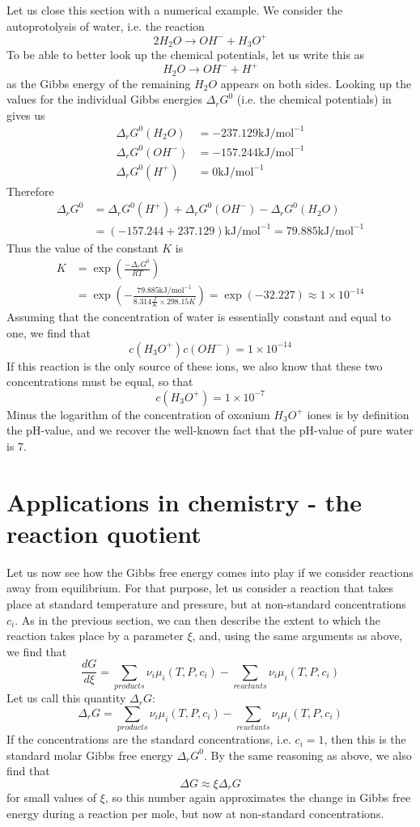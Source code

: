 \documentclass[a4paper, draft]{article}
\theoremstyle{own}
\theoremstyle{remark}
\begin{document}
Let us close this section with a numerical example. We consider the autoprotolysis of water, i.e. the reaction
$$
2 H_2 O \longrightarrow OH^- + H_3 O^+
$$
To be able to better look up the chemical potentials, let us write this as
$$
H_2 O \longrightarrow OH^- + H^+
$$
as the Gibbs energy of the remaining $H_2 O$ appears on both sides. Looking up the values for the individual Gibbs energies $\Delta_r G^0$ (i.e. the chemical potentials) in \cite{Table} gives us
\begin{align*}
\Delta_r G^0(H_2 O) &= - 237.129 \text{kJ} / \text{mol}^{-1} \\
\Delta_r G^0(OH^-) &= - 157.244\text{kJ} / \text{mol}^{-1} \\
\Delta_r G^0(H^+) &= 0 \text{kJ} / \text{mol}^{-1}
\end{align*}
Therefore
\begin{align*}
\Delta_r G^0 &= \Delta_r G^0(H^+) + \Delta_r G^0(OH^-) - \Delta_r G^0(H_2 O) \\
&= (- 157.244 + 237.129) \text{kJ} / \text{mol}^{-1} = 79.885 \text{kJ} / \text{mol}^{-1}
\end{align*}
Thus the value of the constant $K$ is
\begin{align*}
K &= \exp(\frac{-\Delta_r G^0}{RT} ) \\
&= \exp(-\frac{79.885 \text{kJ} / \text{mol}^{-1}}{8.314 \frac{J}{K} \times 298.15 K} ) = \exp(-32.227) \approx 1 \times 10^{-14} 
\end{align*}	
Assuming that the concentration of water is essentially constant and equal to one, we find that
$$
c(H_3O^+) c(OH^-) = 1 \times 10^{-14}
$$
If this reaction is the only source of these ions, we also know that these two concentrations must be equal, so that
$$
c(H_3O^+)  = 1 \times 10^{-7}
$$
Minus the logarithm of the concentration of oxonium $H_3 O^+$ iones is by definition the pH-value, and we recover the well-known fact that the pH-value of pure water is 7.

\section{Applications in chemistry - the reaction quotient}

Let us now see how the Gibbs free energy comes into play if we consider reactions away from equilibrium. For that purpose, let us consider a reaction that takes place at standard temperature and pressure, but at non-standard concentrations $c_i$. As in the previous section, we can then describe the extent to which the reaction takes place by a parameter $\xi$, and, using the same arguments as above, we find that
$$
\frac{dG}{d\xi} = \sum_{products} \nu_i \mu_i(T, P, c_i) - \sum_{reactants} \nu_i \mu_i(T, P, c_i)
$$
Let us call this quantity $\Delta_r G$:
$$
\Delta_r G = \sum_{products} \nu_i \mu_i(T, P, c_i) - \sum_{reactants} \nu_i \mu_i(T, P, c_i)
$$
If the concentrations are the standard concentrations, i.e. $c_i = 1$, then this is the standard molar Gibbs free energy $\Delta_r G^0$. By the same reasoning as above, we also find that
$$
\Delta G \approx \xi \Delta_r G
$$
for small values of $\xi$, so this number again approximates the change in Gibbs free energy during a reaction per mole, but now at non-standard concentrations.
\end{document}

